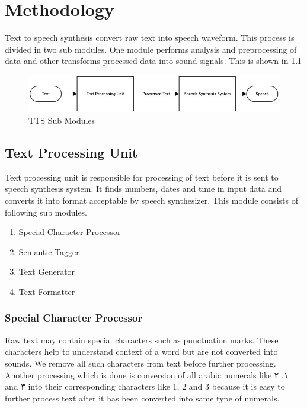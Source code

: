 \chapter{Methodology}

Text to speech synthesis convert raw text into speech waveform. This process is divided in two sub modules. One module performs analysis and preprocessing of data and other transforms processed data into sound signals. This is shown in \ref{fig:TTS Sub Modules}

\begin{figure}[hp]
  \centering
  \includegraphics[width=\linewidth]{images/tts_flow_dg.jpg}
  \caption{TTS Sub Modules}
  \label{fig:TTS Sub Modules}
\end{figure}

\section{Text Processing Unit}
Text processing unit is responsible for processing of text before it is sent to speech synthesis system. It finds numbers, dates and time in input data and converts it into format acceptable by speech synthesizer. This module consists of following sub modules.

\begin{enumerate}
  \item Special Character Processor
  \item Semantic Tagger  
  \item Text Generator
  \item Text Formatter 
\end{enumerate}

\subsection{Special Character Processor}

Raw text may contain special characters such as punctuation marks. These characters help to understand context of a word but 
are not converted into sounds. We remove all such characters from text before further processing. 
Another processing which is done is conversion of all arabic numerals like \textarabic{١}, \textarabic{٢} and \textarabic{٣} into their corresponding 
characters like 1, 2 and 3 because it is easy to further process text after it has been converted into same type of numerals.


